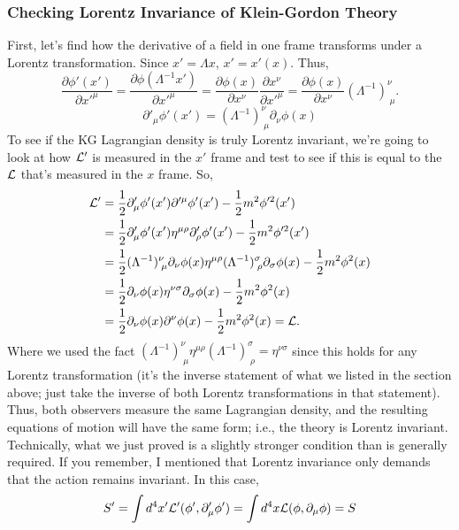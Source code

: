 \subsubsection{Checking Lorentz Invariance of Klein-Gordon Theory}
First, let's find how the derivative of a field in one frame transforms under a Lorentz transformation. Since $x' = \Lambda x$, $x' = x'(x)$. Thus,
\[
    \frac{\partial \phi'(x')}{\partial x'^\mu} =\frac{\partial\phi(\Lambda^{-1}x')}{\partial x'^\mu}= \frac{\partial \phi(x)}{\partial x^\nu}\frac{\partial x^\nu}{\partial x'^\mu} = \frac{\partial \phi(x)}{\partial x^\nu}(\Lambda^{-1})^\nu_{\;\mu}.
\]
\[
    \partial'_\mu\phi'(x') = (\Lambda^{-1})^\nu_{\;\mu}\partial_\nu\phi(x)
\]
To see if the KG Lagrangian density is truly Lorentz invariant, we're going to look at how $\mathcal{L}'$ is measured in the $x'$ frame and test to see if this is equal to the $\mathcal{L}$ that's measured in the $x$ frame. So,
\begin{align*}
    \mathcal{L}'&= \frac{1}{2}\partial'_\mu\phi'(x')\partial'^\mu\phi'(x') - \frac{1}{2}m^2\phi'^2(x')\\
    & = \frac{1}{2}\partial'_\mu\phi'(x')\eta^{\mu\rho}\partial'_\rho\phi'(x') - \frac{1}{2}m^2\phi'^2(x')\\
    &=\frac{1}{2}(\Lambda^{-1})^\nu_{\;\mu}\partial_\nu\phi(x)\eta^{\mu\rho}(\Lambda^{-1})^\sigma_{\;\rho}\partial_\sigma\phi(x)-\frac{1}{2}m^2\phi^2(x)\\
    & =\frac{1}{2}\partial_\nu\phi(x)\eta^{\nu\sigma}\partial_\sigma\phi(x) - \frac{1}{2}m^2\phi^2(x)\\
    &=\frac{1}{2}\partial_\nu\phi(x)\partial^\nu\phi(x)-\frac{1}{2}m^2\phi^2(x) = \mathcal{L}.
\end{align*}
Where we used the fact $(\Lambda^{-1})^\nu_{\;\mu}\eta^{\mu\rho}(\Lambda^{-1})^\sigma_{\;\rho}=\eta^{\nu\sigma}$ since this holds for any Lorentz transformation (it's the inverse statement of what we listed in the section above; just take the inverse of both Lorentz transformations in that statement). Thus, both observers measure the same Lagrangian density, and the resulting equations of motion will have the same form; i.e., the theory is Lorentz invariant. Technically, what we just proved is a slightly stronger condition than is generally required. If you remember, I mentioned that Lorentz invariance only demands that the action remains invariant. In this case,     
\[
    S' = \int d^4x' \mathcal{L}'(\phi', \partial'_\mu\phi') = \int d^4x \mathcal{L} (\phi, \partial_\mu\phi) = S
\]

